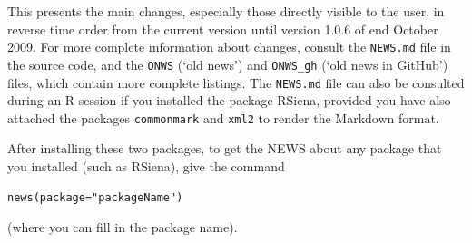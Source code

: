 \documentclass[a4paper,fleqn,11pt]{article}
\newcommand{\+}{\, + \,}
\newcommand{\R}{{\sf R }}
\newcommand{\rs}{{\sf RSiena}}
\begin{document}
This presents the main changes, especially those directly visible to the user,
in reverse time order from the current version until
version 1.0.6 of end October 2009.
For more complete information about changes,
consult the \texttt{NEWS.md} file in the source code,
and the \texttt{ONWS} (`old news') and \texttt{ONWS\_gh} (`old news in GitHub')  files,
which contain more complete listings.
The \texttt{NEWS.md} file can also be consulted during an \R session if you
installed the package \rs, provided you have also attached the
packages \texttt{commonmark} and \texttt{xml2} to render the Markdown format.

After installing these two packages,
to get the NEWS about any package that you installed
(such  as \rs), give the command
\begin{verbatim}
news(package="packageName")
\end{verbatim}
(where you can fill in the package name).
\bigskip
\end{document}
